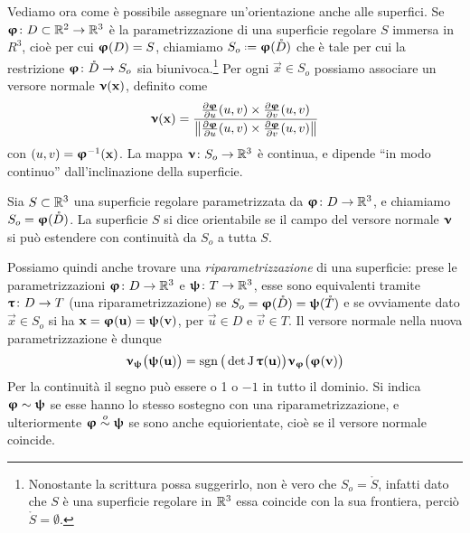 Vediamo ora come è possibile assegnare un'orientazione anche alle superfici.
Se $\bm{\upvarphi}\colon D\subset\mathbb{R}^2\to\mathbb{R}^3$ è la parametrizzazione di una superficie regolare $S$ immersa in $R^3$, cioè per cui $\bm{\upvarphi}(D)=S$, chiamiamo $S_o\defeq\vphi(\mathring{D})$ che è tale per cui la restrizione $\bm{\upvarphi}\colon\mathring{D}\to S_o$ sia biunivoca.\footnote{Nonostante la scrittura possa suggerirlo, non è vero che $S_o=\mathring{S}$, infatti dato che $S$ è una superficie regolare in $\mathbb{R}^3$ essa coincide con la sua frontiera, perciò $\mathring{S}=\emptyset$.}
Per ogni $\vec x\in S_o$ possiamo associare un versore normale $\bm{\upnu}(\mathbf{x})$, definito come
\begin{equation}
	\bm{\upnu}(\mathbf{x})=\frac{\frac{\partial {\bm{\upvarphi}}}{\partial {u}}(u,v)\times\frac{\partial {\bm{\upvarphi}}}{\partial {v}}(u,v)}{\left\|{\frac{\partial {\bm{\upvarphi}}}{\partial {u}}(u,v)\times\frac{\partial {\bm{\upvarphi}}}{\partial {v}}(u,v)}\right\|}
\end{equation}
con $(u,v)=\bm{\upvarphi}^{-1}(\mathbf{x})$.
La mappa $\bm{\upnu}\colon S_o\to\mathbb{R}^3$ è continua, e dipende ``in modo continuo'' dall'inclinazione della superficie.
\begin{definizione} \label{d:superficie-orientabile}
	Sia $S\subset\mathbb{R}^3$ una superficie regolare parametrizzata da $\bm{\upvarphi}\colon D\to\mathbb{R}^3$, e chiamiamo $S_o=\bm{\upvarphi}(\mathring{D})$.
	La superficie $S$ si dice orientabile se il campo del versore normale $\bm{\upnu}$ si può estendere con continuità da $S_o$ a tutta $S$.
\end{definizione}
Possiamo quindi anche trovare una \emph{riparametrizzazione} di una superficie: prese le parametrizzazioni $\bm{\upvarphi}\colon D\to\mathbb{R}^3$ e $\bm{\uppsi}\colon T\to\mathbb{R}^3$, esse sono equivalenti tramite $\bm{\uptau}\colon D\to T$ (una riparametrizzazione) se $S_o=\bm{\upvarphi}(\mathring{D})=\bm{\uppsi}(\mathring{T})$ e se ovviamente dato $\vec x\in S_o$ si ha $\mathbf{x}=\bm{\upvarphi}(\mathbf{u})=\bm{\uppsi}(\mathbf{v})$, per $\vec u\in D$ e $\vec v\in T$.
Il versore normale nella nuova parametrizzazione è dunque
\begin{equation}
	\bm{\upnu}_{\bm{\uppsi}}\big(\bm{\uppsi}(\mathbf{u})\big)=\operatorname{sgn}\big(\det\operatorname{J}\bm{\uptau}(\mathbf{u})\big)\bm{\upnu}_{\bm{\upvarphi}}\big(\bm{\upvarphi}(\mathbf{v})\big)
\end{equation}
Per la continuità il segno può essere o 1 o $-1$ in tutto il dominio.
Si indica $\bm{\upvarphi}\sim\bm{\uppsi}$ se esse hanno lo stesso sostegno con una riparametrizzazione, e ulteriormente $\bm{\upvarphi}\overset{o}{\sim}\bm{\uppsi}$ se sono anche equiorientate, cioè se il versore normale coincide.

